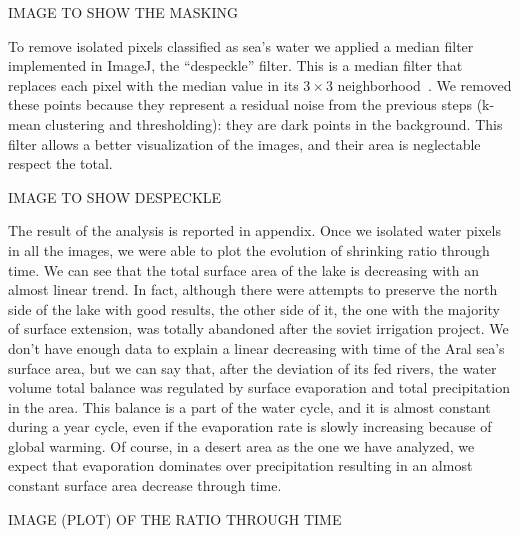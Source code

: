 IMAGE TO SHOW THE MASKING 

To remove isolated pixels classified as sea’s water we applied a median filter implemented in ImageJ, the “despeckle” filter. 
This is a median filter that replaces each pixel with the median value in its $3 \times 3$ neighborhood~\cite{despeckle}.
We removed these points because they represent a residual noise from the previous steps (k-mean clustering and thresholding): they are dark points in the background. 
This filter allows a better visualization of the images, and their area is neglectable respect the total.  

IMAGE TO SHOW DESPECKLE 

The result of the analysis is reported in appendix. 
Once we isolated water pixels in all the images, we were able to plot the evolution of shrinking ratio through time. 
We can see that the total surface area of the lake is decreasing with an almost linear trend. 
In fact, although there were attempts to preserve the north side of the lake with good results, the other side of it, the one with the majority of surface extension, was totally abandoned after the soviet irrigation project. 
We don’t have enough data to explain a linear decreasing with time of the Aral sea’s surface area, but we can say that, after the deviation of its fed rivers, the water volume total balance was regulated by surface evaporation and total precipitation in the area. 
This balance is a part of the water cycle, and it is almost constant during a year cycle, even if the evaporation rate is slowly increasing because of global warming. 
Of course, in a desert area as the one we have analyzed, we expect that evaporation dominates over precipitation resulting in an almost constant surface area decrease through time.  

IMAGE (PLOT) OF THE RATIO THROUGH TIME 

